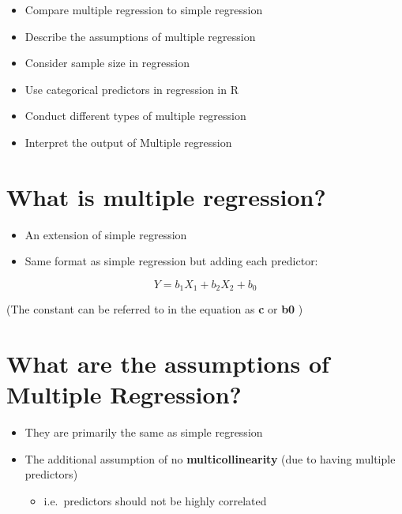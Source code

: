 \documentclass[
]{book}
\providecommand{\tightlist}{%
  \setlength{\itemsep}{0pt}\setlength{\parskip}{0pt}}
\begin{document}
\begin{itemize}
\tightlist
\item
  Compare multiple regression to simple regression
\item
  Describe the assumptions of multiple regression
\item
  Consider sample size in regression
\item
  Use categorical predictors in regression in R
\item
  Conduct different types of multiple regression
\item
  Interpret the output of Multiple regression
\end{itemize}

\hypertarget{what-is-multiple-regression}{%
\section{What is multiple regression?}\label{what-is-multiple-regression}}

\begin{itemize}
\tightlist
\item
  An extension of simple regression
\item
  Same format as simple regression but adding each predictor:
\end{itemize}

\[ Y = b_1X_1 + b_2X_2 + b_0 \]

(The constant can be referred to in the equation as \textbf{c} or \textbf{b0} )

\hypertarget{what-are-the-assumptions-of-multiple-regression}{%
\section{What are the assumptions of Multiple Regression?}\label{what-are-the-assumptions-of-multiple-regression}}

\begin{itemize}
\tightlist
\item
  They are primarily the same as simple regression
\item
  The additional assumption of no \textbf{multicollinearity} (due to having multiple predictors)

  \begin{itemize}
  \tightlist
  \item
    i.e.~predictors should not be highly correlated
  \end{itemize}
\end{itemize}
\end{document}
